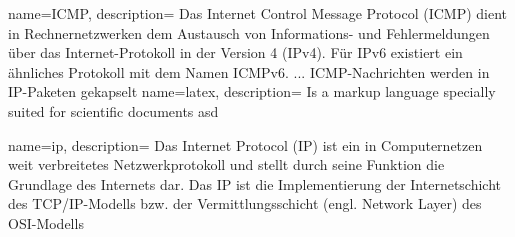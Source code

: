 
\makeglossaries
{}
{
	name=ICMP,
	description={
		Das Internet Control Message Protocol (ICMP) dient in Rechnernetzwerken dem Austausch von Informations- und Fehlermeldungen über das Internet-Protokoll in der Version 4 (IPv4). Für IPv6 existiert ein ähnliches Protokoll mit dem Namen ICMPv6. ... ICMP-Nachrichten werden in IP-Paketen gekapselt}
}
{
	name=latex,
	description={
		Is a markup language specially suited 
		for scientific documents asd}
}

{
	name=ip,
	description={
		Das Internet Protocol (IP) ist ein in Computernetzen weit verbreitetes Netzwerkprotokoll und stellt durch seine Funktion die Grundlage des Internets dar. Das IP ist die Implementierung der Internetschicht des TCP/IP-Modells bzw. der Vermittlungsschicht (engl. Network Layer) des OSI-Modells}
}